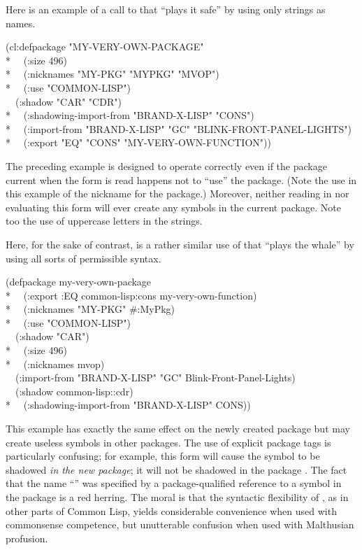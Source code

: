 \begin{new}
\begin{defmac}
Here is an example of a call to  that ``plays it safe''
by using only strings as names.
\begin{lisp}
(cl:defpackage "MY-VERY-OWN-PACKAGE" \\*
~~(:size 496) \\*
~~(:nicknames "MY-PKG" "MYPKG" "MVOP") \\*
~~(:use "COMMON-LISP") \\
~~(:shadow "CAR" "CDR") \\*
~~(:shadowing-import-from "BRAND-X-LISP" "CONS") \\*
~~(:import-from "BRAND-X-LISP" "GC" "BLINK-FRONT-PANEL-LIGHTS") \\*
~~(:export "EQ" "CONS" "MY-VERY-OWN-FUNCTION"))
\end{lisp}
The preceding  example is designed to operate correctly
even if the package current when the form is read happens not to
``use'' the  package.  (Note the use in this example
of the nickname  for the  package.)
Moreover, neither reading in nor evaluating
this  form will ever create any symbols in the
current package.  Note too the use of uppercase letters in the strings.

Here, for the sake of contrast, is a rather similar use of
 that ``plays the whale'' by using all sorts of
permissible syntax.
\begin{lisp}
(defpackage my-very-own-package \\*
~~(:export :EQ common-lisp:cons my-very-own-function) \\*
~~(:nicknames "MY-PKG" \#:MyPkg) \\*
~~(:use "COMMON-LISP") \\
~~(:shadow "CAR") \\*
~~(:size 496) \\*
~~(:nicknames mvop) \\
~~(:import-from "BRAND-X-LISP" "GC" Blink-Front-Panel-Lights) \\
~~(:shadow common-lisp::cdr) \\*
~~(:shadowing-import-from "BRAND-X-LISP" CONS))
\end{lisp}
This example has exactly the same effect on the newly created package
but may create useless symbols in other packages.
The use of explicit package tags is particularly confusing;
for example, this  form will cause the symbol
 to be shadowed {\it in the new package}; it will not be
shadowed in the package .  The fact that the name ``''
was specified by a package-qualified reference to a symbol in the
 package is a red herring.
The moral is that the syntactic flexibility of ,
as in other parts of Common Lisp,
yields considerable convenience when used with commonsense competence,
but unutterable confusion when used with Malthusian profusion.


\end{defmac}
\end{new}
